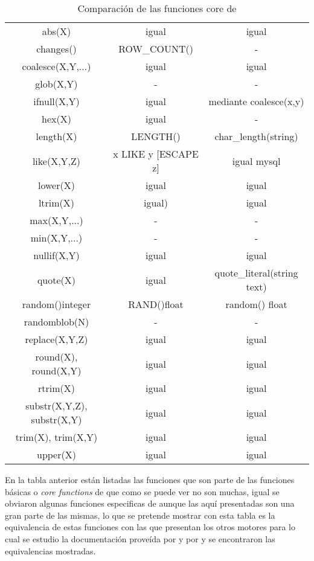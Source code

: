\begin{table}[h]
\begin{center}
{
\selectfont
\begin{tabular}{|c|c|c|}
\hline 
\s & \m & \p \\  
\hline 
abs(X) & igual & igual \\ 
\hline 
changes() & ROW\_COUNT() & - \\ 
\hline 
coalesce(X,Y,...) & igual & igual \\ 
\hline 
glob(X,Y) & - & - \\ 
\hline 
ifnull(X,Y) & igual & mediante coalesce(x,y) \\ 
\hline 
hex(X) & igual & - \\ 
\hline 
length(X) & LENGTH() & char\_length(string) \\ 
\hline 
like(X,Y,Z) & x LIKE y [ESCAPE z] & igual mysql \\ 
\hline 
lower(X) & igual & igual \\ 
\hline 
ltrim(X) & igual) & igual \\ 
\hline 
max(X,Y,...) & - & - \\ 
\hline 
min(X,Y,...) & - & - \\ 
\hline 
nullif(X,Y) & igual & igual \\ 
\hline 
quote(X) & igual & quote\_literal(string text) \\ 
\hline 
random()integer & RAND()float & random() float \\ 
\hline 
randomblob(N) & - & - \\ 
\hline 
replace(X,Y,Z) & igual & igual \\ 
\hline 
round(X), round(X,Y) & igual & igual \\ 
\hline 
rtrim(X) & igual & igual \\ 
\hline 
substr(X,Y,Z), substr(X,Y) & igual & igual \\ 
\hline
trim(X), trim(X,Y) & igual & igual \\ 
\hline
upper(X) & igual & igual \\ 
\hline
\end{tabular}
}
\end{center}
\caption{Comparación de las funciones core de \s}
\end{table}  

En la tabla anterior están listadas las funciones que son parte de las funciones básicas\citep{sqlite:functions} o \textit{core functions} de \s que como se puede ver no son muchas, igual se obviaron algunas funciones especificas de \s aunque las aquí presentadas son una gran parte de las mismas, lo que se pretende mostrar con esta tabla es la equivalencia de estas funciones con las que presentan los otros motores para lo cual se estudio la documentación proveída por \p\cite{postgre:functions} y por \m\citep{mysql:functions} y se encontraron las equivalencias mostradas.

